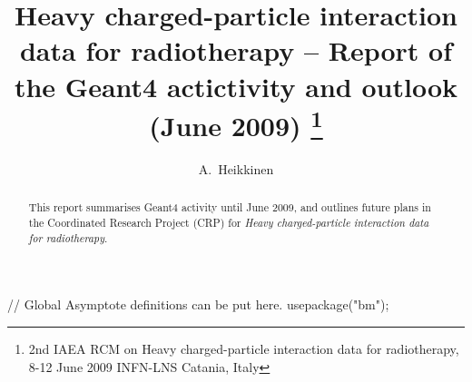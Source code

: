 \documentclass[twoside,floatfix,a4wide]{d}
\numberwithin{equation}{section} %
\begin{document}

\begin{asydef}
// Global Asymptote definitions can be put here.
usepackage("bm");
\end{asydef}

\title{Heavy charged-particle interaction data for radiotherapy -- 
      Report of the Geant4 actictivity and outlook (June 2009)
\footnote{2nd IAEA RCM on Heavy charged-particle interaction data for radiotherapy, 
                 8-12 June 2009 INFN-LNS Catania, Italy}}

\author{A.~Heikkinen} 


\begin{abstract}
This report summarises Geant4 activity until June 2009, 
and outlines future plans in the Coordinated Research Project (CRP)
for {\em Heavy charged-particle interaction data for radiotherapy}.
\end{abstract}

\maketitle
\thispagestyle{fancy}

\end{document}
